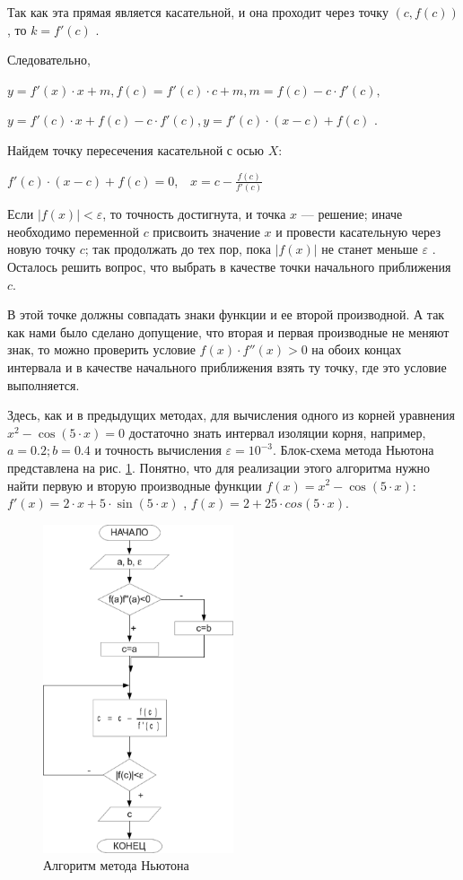 Так как эта прямая является касательной, и она проходит через точку  $(c,f(c))$ , то  $k=f'(c)$ . 

Следовательно, 

$y=f'(x)\cdot x+m,f(c)=f'(c)\cdot c+m,m=f(c)-c\cdot f'(c),$

 $y=f'(c)\cdot x+f(c)-c\cdot f'(c),y=f'(c)\cdot (x-c)+f(c)$ .

Найдем точку пересечения касательной с осью $X$:

 $f'(c)\cdot (x-c)+f(c)=0$,\ \ ${x=c-\frac{f(c)}{f'(c)}}$  

Если  $|f(x)|<\varepsilon$, то точность достигнута, и точка $x$ --- решение; иначе необходимо переменной
$c$ присвоить значение $x$ и провести касательную через новую точку
$c$; так продолжать до тех пор, пока  $|f(x)|$  не станет меньше  $\varepsilon$ . Осталось решить
вопрос, что выбрать в качестве точки начального приближения $c$.

В этой точке должны совпадать знаки функции и ее второй производной. А так как нами было сделано допущение, что вторая и
первая производные не меняют знак, то можно проверить условие  $f(x)\cdot f''(x)>0$ на обоих 
концах интервала и в качестве начального приближения взять ту точку, где это условие
выполняется.

Здесь, как и в предыдущих методах, для вычисления одного из корней уравнения  $x^2-\cos (5\cdot x)=0$  достаточно
знать интервал изоляции корня, например,  $a=0.2;b=0.4$  и точность вычисления  $\varepsilon=10^{-3}$. Блок-схема
метода Ньютона представлена на рис. \ref{ch04:refDrawing7}. Понятно, что для реализации этого алгоритма нужно найти первую и
вторую производные функции  $f(x)=x^2-\cos (5\cdot x)$:  $f'(x)=2\cdot x+5\cdot \sin (5\cdot x)$ , 
$f(x) =2 +25 \cdot cos(5 \cdot x)$.

\begin{figure}[htb]
\begin{center}
\includegraphics[width=0.5\textwidth]{img/ris_4_8}
\caption{Алгоритм метода Ньютона}
\label{ch04:refDrawing7}
\end{center}
\end{figure}

